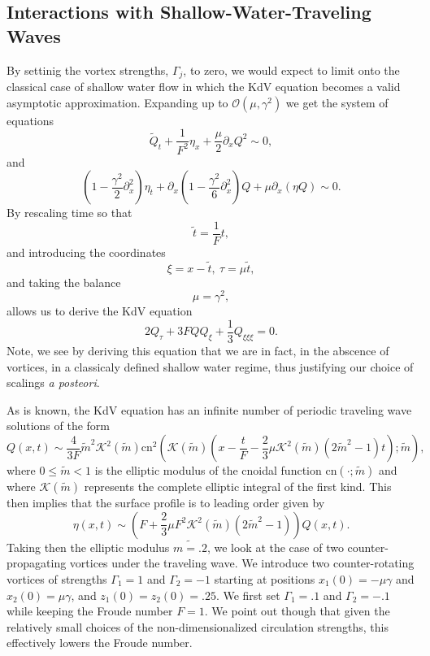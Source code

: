 \documentclass[a4paper,11pt]{article}
\newcommand{\p}{\partial}
\begin{document}
\subsection*{Interactions with Shallow-Water-Traveling Waves}
By settinig the vortex strengths, $\Gamma_{j}$, to zero, we would expect to limit onto the classical case of shallow water flow in which the KdV equation becomes a valid asymptotic approximation.  Expanding up to $\mathcal{O}(\mu,\gamma^{2})$ we get the system of equations 
\[
\tilde{Q}_{t} + \frac{1}{F^{2}}\eta_{x} + \frac{\mu}{2}\p_{x}Q^{2} \sim 0, 
\]
and
\[
\left(1 - \frac{\gamma^{2}}{2}\p_{x}^{2}\right)\eta_{t} + \p_{x}\left(1-\frac{\gamma^{2}}{6}\p_{x}^{2} \right)Q + \mu \p_{x}(\eta Q) \sim 0.
\]
By rescaling time so that 
\[
\tilde{t} = \frac{1}{F} t,
\]
and introducing the coordinates
\[
\xi = x - \tilde{t}, ~ \tau = \mu \tilde{t}, 
\]
and taking the balance 
\[
\mu = \gamma^{2}, 
\]
allows us to derive the KdV equation
\[
2Q_{\tau} + 3F QQ_{\xi} + \frac{1}{3} Q_{\xi\xi\xi} = 0.
\]
Note, we see by deriving this equation that we are in fact, in the abscence of vortices, in a classicaly defined shallow water regime, thus justifying our choice of scalings {\it a posteori}.  

As is known, the KdV equation has an infinite number of periodic traveling wave solutions of the form 
\[
Q(x,t) \sim \frac{4}{3F} \tilde{m}^{2}\mathcal{K}^2(\tilde{m})\mbox{cn}^{2}\left(\mathcal{K}(\tilde{m}) \left( x- \frac{t}{F} - \frac{2}{3}\mu\mathcal{K}^{2}(\tilde{m}) (2\tilde{m}^{2}-1)t\right);\tilde{m}\right),
\]
where $0\leq \tilde{m}<1$ is the elliptic modulus of the cnoidal function $\mbox{cn}(\cdot;\tilde{m})$ and where $\mathcal{K}(\tilde{m})$ represents the complete elliptic integral of the first kind.  This then implies that the surface profile is to leading order given by 
\[
\eta(x,t) \sim \left(F+\frac{2}{3}\mu F^{2}\mathcal{K}^{2}(\tilde{m})(2\tilde{m}^{2}-1)\right)Q(x,t).
\]
Taking then the elliptic modulus $\tilde{m=.2}$, we look at the case of two counter-propagating vortices under the traveling wave.  We introduce two counter-rotating vortices of strengths $\Gamma_{1}=1$ and $\Gamma_{2}=-1$ starting at positions $x_{1}(0)=-\mu\gamma$ and $x_{2}(0)=\mu\gamma$, and $z_{1}(0)=z_{2}(0)=.25$.  We first set $\Gamma_{1}=.1$ and $\Gamma_{2}=-.1$ while keeping the Froude number $F=1$.  We point out though that given the relatively small choices of the non-dimensionalized circulation strengths, this effectively lowers the Froude number.   
\end{document}
